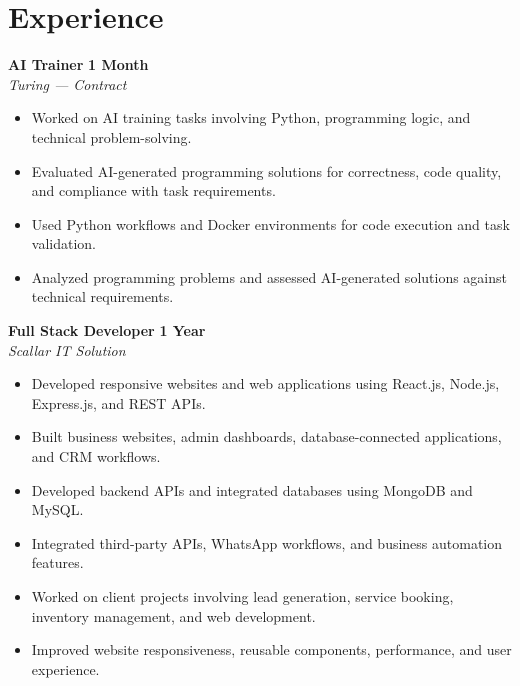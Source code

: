 \documentclass[a4paper,10pt]{article}
\begin{document}
\section*{Experience}
\vspace{2pt}
\noindent \textbf{AI Trainer} \hfill \textbf{1 Month}\\
\textit{Turing --- Contract}
\begin{itemize}
    \item Worked on AI training tasks involving Python, programming logic, and technical problem-solving.
    \item Evaluated AI-generated programming solutions for correctness, code quality, and compliance with task requirements.
    \item Used Python workflows and Docker environments for code execution and task validation.
    \item Analyzed programming problems and assessed AI-generated solutions against technical requirements.
\end{itemize}

\vspace{4pt}
\noindent \textbf{Full Stack Developer} \hfill \textbf{1 Year}\\
\textit{Scallar IT Solution}
\begin{itemize}
    \item Developed responsive websites and web applications using React.js, Node.js, Express.js, and REST APIs.
    \item Built business websites, admin dashboards, database-connected applications, and CRM workflows.
    \item Developed backend APIs and integrated databases using MongoDB and MySQL.
    \item Integrated third-party APIs, WhatsApp workflows, and business automation features.
    \item Worked on client projects involving lead generation, service booking, inventory management, and web development.
    \item Improved website responsiveness, reusable components, performance, and user experience.
\end{itemize}

\end{document}
